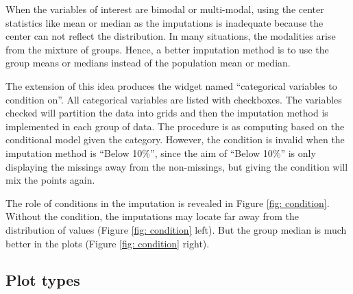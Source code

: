 \documentclass[english]{article}
\begin{document}
When the variables of interest are bimodal or multi-modal, using the center statistics like mean or median as the imputations is inadequate because the center can not reflect the distribution. In many situations, the modalities arise from the mixture of groups. Hence, a better imputation method is to use the group means or medians instead of the population mean or median.

The extension of this idea produces the widget named ``categorical variables to condition on''. All categorical variables are listed with checkboxes. The variables checked will partition the data into grids and then the imputation method is implemented in each group of data. The procedure is as computing based on the conditional model given the category. However, the condition is invalid when the imputation method is ``Below 10\%'', since the aim of ``Below 10\%'' is only displaying the missings away from the non-missings, but giving the condition will mix the points again.

The role of conditions in the imputation is revealed in Figure \ref{fig: condition}. Without the condition, the imputations may locate far away from the distribution of values (Figure \ref{fig: condition} left). But the group median is much better in the plots (Figure \ref{fig: condition} right).

\subsection{Plot types}
\end{document}
